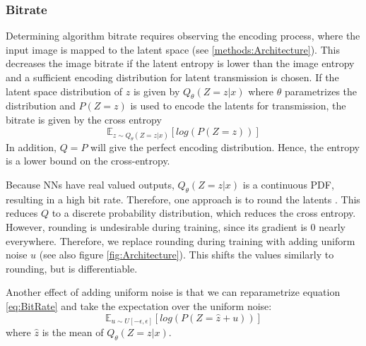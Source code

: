     \subsubsection{Bitrate}
        Determining algorithm bitrate requires observing the encoding
        process, where the input image is mapped to the
        latent space (see \ref{methods:Architecture}). This decreases the
        image bitrate if the latent entropy is lower than the image entropy and a sufficient encoding distribution for latent transmission is chosen. If the latent
        space distribution of $z$ is given by $Q_\theta(Z=z \vert x)$ where $\theta$
        parametrizes the distribution and $P(Z=z)$ is used to encode the latents for transmission, the bitrate is given by the cross entropy
        \begin{equation}\label{eq:BitRate}
            \mathbb{E}_{z \sim Q_\theta(Z=z \vert x)}[log(P(Z=z))]
        \end{equation}
        In addition, $Q=P$ will give the perfect encoding distribution. Hence, the
        entropy is a lower bound on the cross-entropy.

        Because NNs have real valued outputs, ${Q_\theta(Z=z\vert x)}$
         is a continuous PDF, resulting in a high bit rate. Therefore, one
        approach is to round the latents \cite{DBLP:journals/corr/BalleLS16a}. This reduces $Q$ to a discrete
        probability distribution, which reduces the cross entropy. However, rounding
        is undesirable during training, since its gradient is 0 nearly everywhere. Therefore, we replace
        rounding during training with adding uniform noise $u$ (see also
        figure \ref{fig:Architecture}). This shifts the values
        similarly to rounding, but is differentiable.

        Another effect of adding uniform noise is that we can reparametrize equation
        \ref{eq:BitRate} and take the expectation over the uniform noise:
        \begin{equation}
            \mathbb{E}_{u \sim U[-\epsilon, \epsilon]}[log(P(Z=\hat{z} + u))]
        \end{equation}
        where $\hat{z}$ is the mean of $Q_\theta(Z=z \vert x)$. \newline




